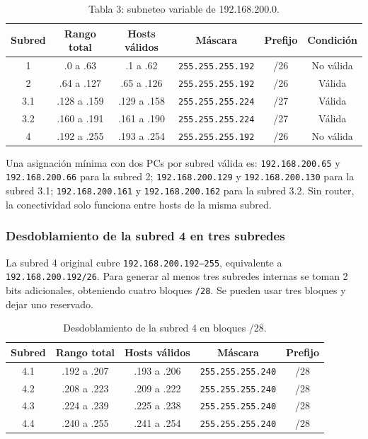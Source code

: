 \documentclass[a4paper,12pt]{article}
\newcommand{\ip}[1]{\mbox{\texttt{#1}}}
\begin{document}
\begin{table}[H]
\centering
\small
\begin{tabular}{|c|c|c|c|c|c|}
\hline
Subred & Rango total & Hosts válidos & Máscara & Prefijo & Condición \\
\hline
1 & .0 a .63 & .1 a .62 & \ip{255.255.255.192} & /26 & No válida \\
2 & .64 a .127 & .65 a .126 & \ip{255.255.255.192} & /26 & Válida \\
3.1 & .128 a .159 & .129 a .158 & \ip{255.255.255.224} & /27 & Válida \\
3.2 & .160 a .191 & .161 a .190 & \ip{255.255.255.224} & /27 & Válida \\
4 & .192 a .255 & .193 a .254 & \ip{255.255.255.192} & /26 & No válida \\
\hline
\end{tabular}
\caption{Tabla 3: subneteo variable de 192.168.200.0.}
\end{table}

Una asignación mínima con dos PCs por subred válida es: \ip{192.168.200.65} y \ip{192.168.200.66} para la subred 2; \ip{192.168.200.129} y \ip{192.168.200.130} para la subred 3.1; \ip{192.168.200.161} y \ip{192.168.200.162} para la subred 3.2. Sin router, la conectividad solo funciona entre hosts de la misma subred.


\subsubsection{Desdoblamiento de la subred 4 en tres subredes}

La subred 4 original cubre \ip{192.168.200.192--255}, equivalente a \ip{192.168.200.192/26}. Para generar al menos tres subredes internas se toman 2 bits adicionales, obteniendo cuatro bloques \ip{/28}. Se pueden usar tres bloques y dejar uno reservado.

\begin{table}[H]
\centering
\small
\begin{tabular}{|c|c|c|c|c|}
\hline
Subred & Rango total & Hosts válidos & Máscara & Prefijo \\
\hline
4.1 & .192 a .207 & .193 a .206 & \ip{255.255.255.240} & /28 \\
4.2 & .208 a .223 & .209 a .222 & \ip{255.255.255.240} & /28 \\
4.3 & .224 a .239 & .225 a .238 & \ip{255.255.255.240} & /28 \\
4.4 & .240 a .255 & .241 a .254 & \ip{255.255.255.240} & /28 \\
\hline
\end{tabular}
\caption{Desdoblamiento de la subred 4 en bloques /28.}
\end{table}
\end{document}
